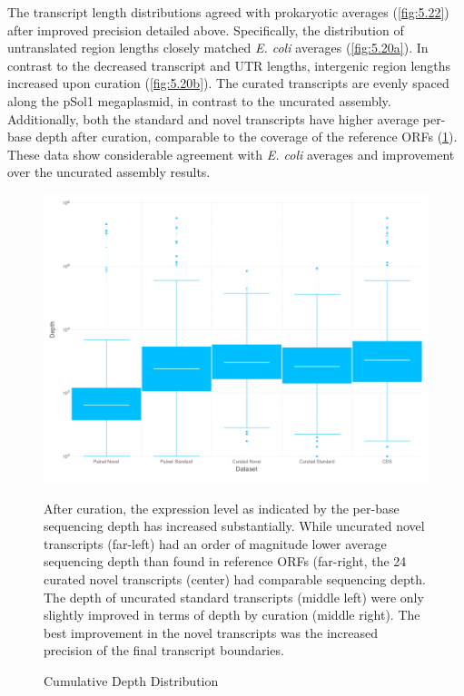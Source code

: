 The transcript length distributions agreed with prokaryotic averages (\ref{fig:5.22}) after improved precision detailed above.\cite{86} Specifically, the distribution of untranslated region lengths closely matched \textit{E. coli} averages\cite{87} (\ref{fig:5.20a}). In contrast to the decreased transcript and UTR lengths, intergenic region lengths increased upon curation (\ref{fig:5.20b}). The curated transcripts are evenly spaced along the pSol1 megaplasmid, in contrast to the uncurated assembly. Additionally, both the standard and novel transcripts have higher average per-base depth after curation, comparable to the coverage of the reference ORFs (\ref{fig:5.21}). These data show considerable agreement with \textit{E. coli} averages and improvement over the uncurated assembly results.



\begin{figure}
\small
\includegraphics[width=\textwidth]{images/Assembly/Curation/CurvsUncur_boxplot.png}
\caption{Cumulative Depth Distribution}\label{fig:5.21}
After curation, the expression level as indicated by the per-base sequencing depth has increased substantially. While uncurated novel transcripts (far-left) had an order of magnitude lower average sequencing depth than found in reference ORFs (far-right, the 24 curated novel transcripts (center) had comparable sequencing depth. The depth of uncurated standard transcripts (middle left) were only slightly improved in terms of depth by curation (middle right). The best improvement in the novel transcripts was the increased precision of the final transcript boundaries.
\end{figure}

